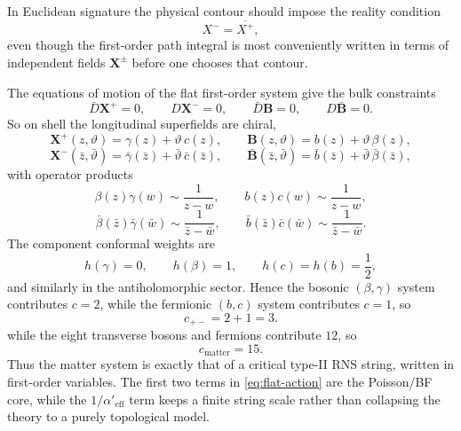 \documentclass[11pt]{article}
\newcommand{\Aeff}{\alpha'_{\mathrm{eff}}}
\begin{document}
In Euclidean signature the physical contour should impose the reality condition
\begin{equation}\label{eq:euclidean-reality}
X^-=\overline{X^+},
\end{equation}
even though the first-order path integral is most conveniently written in terms of independent fields $\mathbf X^\pm$ before one chooses that contour.

The equations of motion of the flat first-order system give the bulk constraints
\begin{equation}\label{eq:bulk-chiral-constraints}
\bar D\mathbf X^+=0,
\qquad
D\mathbf X^-=0,
\qquad
\bar D\mathbf B=0,
\qquad
D\bar{\mathbf B}=0.
\end{equation}
So on shell the longitudinal superfields are chiral,
\begin{equation}\label{eq:onshell-plus}
\mathbf X^+(z,\vartheta)=\gamma(z)+\vartheta\,c(z),
\qquad
\mathbf B(z,\vartheta)=b(z)+\vartheta\,\beta(z),
\end{equation}
\begin{equation}\label{eq:onshell-minus}
\mathbf X^-(\bar z,\bar\vartheta)=\bar\gamma(\bar z)+\bar\vartheta\,\bar c(\bar z),
\qquad
\bar{\mathbf B}(\bar z,\bar\vartheta)=\bar b(\bar z)+\bar\vartheta\,\bar\beta(\bar z),
\end{equation}
with operator products
\begin{equation}\label{eq:ope-holomorphic}
\beta(z)\gamma(w)\sim \frac{1}{z-w},
\qquad
b(z)c(w)\sim \frac{1}{z-w},
\end{equation}
\begin{equation}\label{eq:ope-antiholomorphic}
\bar\beta(\bar z)\bar\gamma(\bar w)\sim \frac{1}{\bar z-\bar w},
\qquad
\bar b(\bar z)\bar c(\bar w)\sim \frac{1}{\bar z-\bar w}.
\end{equation}
The component conformal weights are
\begin{equation}\label{eq:component-weights}
h(\gamma)=0,
\qquad
h(\beta)=1,
\qquad
h(c)=h(b)=\frac{1}{2},
\end{equation}
and similarly in the antiholomorphic sector. Hence the bosonic $(\beta,\gamma)$ system contributes $c=2$, while the fermionic $(b,c)$ system contributes $c=1$, so
\begin{equation}\label{eq:longitudinal-central-charge}
c_{+-}=2+1=3.
\end{equation}
while the eight transverse bosons and fermions contribute $12$, so
\begin{equation}\label{eq:total-central-charge}
c_{\mathrm{matter}}=15.
\end{equation}
Thus the matter system is exactly that of a critical type-II RNS string, written in first-order variables. The first two terms in \eqref{eq:flat-action} are the Poisson/BF core, while the $1/\Aeff$ term keeps a finite string scale rather than collapsing the theory to a purely topological model.
\end{document}
